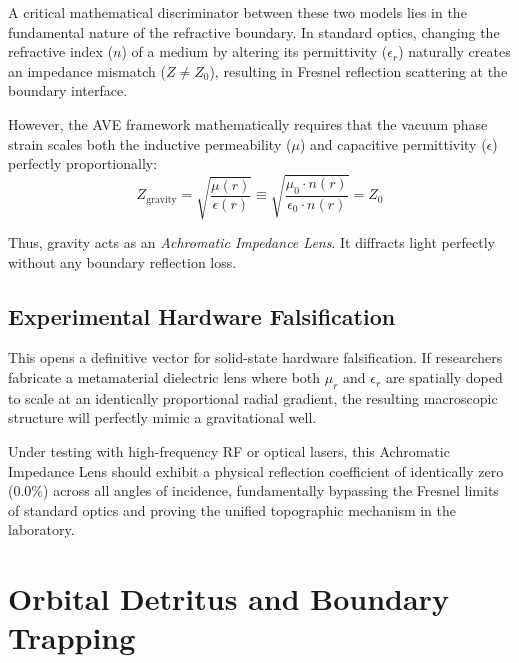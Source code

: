 A critical mathematical discriminator between these two models lies in the fundamental nature of the refractive boundary. In standard optics, changing the refractive index ($n$) of a medium by altering its permittivity ($\epsilon_r$) naturally creates an impedance mismatch ($Z \neq Z_0$), resulting in Fresnel reflection scattering at the boundary interface.

However, the AVE framework mathematically requires that the vacuum phase strain scales both the inductive permeability ($\mu$) and capacitive permittivity ($\epsilon$) perfectly proportionally:
\begin{equation}
    Z_{\text{gravity}} = \sqrt{\frac{\mu(r)}{\epsilon(r)}} \equiv \sqrt{\frac{\mu_0 \cdot n(r)}{\epsilon_0 \cdot n(r)}} = Z_0
\end{equation}

Thus, gravity acts as an \textit{Achromatic Impedance Lens}. It diffracts light perfectly without any boundary reflection loss. 

\subsection{Experimental Hardware Falsification}
This opens a definitive vector for solid-state hardware falsification. If researchers fabricate a metamaterial dielectric lens where both $\mu_r$ and $\epsilon_r$ are spatially doped to scale at an identically proportional radial gradient, the resulting macroscopic structure will perfectly mimic a gravitational well.

Under testing with high-frequency RF or optical lasers, this Achromatic Impedance Lens should exhibit a physical reflection coefficient of identically zero ($0.0\%$) across all angles of incidence, fundamentally bypassing the Fresnel limits of standard optics and proving the unified topographic mechanism in the laboratory.
\section{Orbital Detritus and Boundary Trapping}
\label{sec:boundary_trapping}


